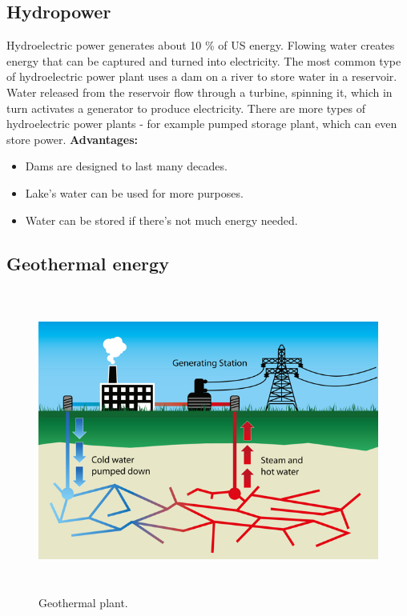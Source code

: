 \documentclass[11pt, titlepage]{article}
\begin{document}
	\subsection{Hydropower}
		Hydroelectric power generates about 10 \% of US energy. Flowing water creates energy that can be captured and turned into electricity. 
		\newline
		The most common type of hydroelectric power plant uses a dam on a river to store water in a reservoir. Water released from the reservoir flow through a turbine, spinning it, which in turn activates a generator to produce electricity.
		\newline
		There are more types of hydroelectric power plants - for example pumped storage plant, which can even store power.
		\newline
		\newline
		\textbf{Advantages:}
		\begin{itemize}
			\item Dams are designed to last many decades.
			\item Lake's water can be used for more purposes.
			\item Water can be stored if there's not much energy needed.
		\end{itemize}

	\subsection{Geothermal energy}
		\begin{figure}[!h]
			\begin{center}
				\includegraphics[height=10cm]{img/geothermal_energy.png}
				\caption{Geothermal plant.}
			\end{center}
	\end{figure}
\end{document}

